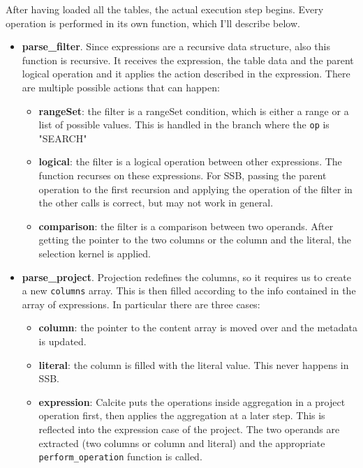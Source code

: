 \documentclass[a4paper, 10pt]{article}
\begin{document}
After having loaded all the tables, the actual execution step begins. Every operation is performed in its own function, which I'll describe below.
\begin{itemize}
    \item \textbf{parse\_filter}. Since expressions are a recursive data structure, also this function is recursive. It receives the expression, the table data and the parent logical operation and it applies the action described in the expression. There are multiple possible actions that can happen:
          \begin{itemize}
              \item \textbf{rangeSet}: the filter is a rangeSet condition, which is either a range or a list of possible values. This is handled in the branch where the \texttt{op} is "SEARCH"
              \item \textbf{logical}: the filter is a logical operation between other expressions. The function recurses on these expressions. For SSB, passing the parent operation to the first recursion and applying the operation of the filter in the other calls is correct, but may not work in general.
              \item \textbf{comparison}: the filter is a comparison between two operands. After getting the pointer to the two columns or the column and the literal, the selection kernel is applied.
          \end{itemize}
    \item \textbf{parse\_project}. Projection redefines the columns, so it requires us to create a new \texttt{columns} array. This is then filled according to the info contained in the array of expressions. In particular there are three cases:
          \begin{itemize}
              \item \textbf{column}: the pointer to the content array is moved over and the metadata is updated.
              \item \textbf{literal}: the column is filled with the literal value. This never happens in SSB.
              \item \textbf{expression}: Calcite puts the operations inside aggregation in a project operation first, then applies the aggregation at a later step. This is reflected into the expression case of the project. The two operands are extracted (two columns or column and literal) and the appropriate \texttt{perform\_operation} function is called.
          \end{itemize}

\end{itemize}
\end{document}
